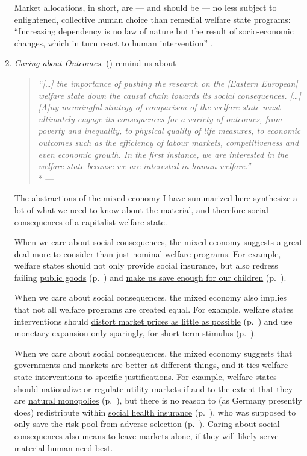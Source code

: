 \begin{enumerate}
	Market allocations, in short, are --- and should be --- no less subject to enlightened, collective human choice than remedial welfare state programs:
	``Increasing dependency is no law of nature but the result of socio-economic changes, which in turn react to human intervention'' \citep[x]{Esping-Andersen2002}.

	\item \emph{Caring about Outcomes.}
	\citeauthor{Haggard2009} (\citeyear[236]{Haggard2009}) remind us about

	\begin{quote}
		\emph{``[\ldots]
		the importance of pushing the research on the [Eastern European] welfare state down the causal chain towards its social consequences.
		[\ldots]
		[A]ny meaningful strategy of comparison of the welfare state must ultimately engage its consequences for a variety of outcomes, from poverty and inequality, to physical quality of life measures, to economic outcomes such as the efficiency of labour markets, competitiveness and even economic growth.
		In the first instance, we are interested in the welfare state because we are interested in human welfare.''}
		\\*
		--- \citet*[236]{Haggard2009}
	\end{quote}

	The abstractions of the mixed economy I have summarized here synthesize a lot of what we need to know about the material, and therefore social consequences of a capitalist welfare state.

	When we care about social consequences, the mixed economy suggests a great deal more to consider than just nominal welfare programs.
	For example, welfare states should not only provide social insurance, but also redress failing \hyperref[sec:public-good]{public goods} (p.~\pageref{sec:public-good}) and \hyperref[sec:long-term-inconsistency]{make us save enough for our children} (p.~\pageref{sec:long-term-inconsistency}).

	When we care about social consequences, the mixed economy also implies that not all welfare programs are created equal.
	For example, welfare states interventions should \hyperref[sec:minimal-DWL]{distort market prices as little as possible} (p.~\pageref{sec:minimal-DWL}) and use \hyperref[sec:price-stability]{monetary expansion only sparingly, for short-term stimulus} (p.~\pageref{sec:price-stability}).

	When we care about social consequences, the mixed economy suggests that  governments and markets are better at different things, and it ties welfare state interventions to specific justifications.
	For example, welfare states should nationalize or regulate utility markets if and to the extent that they are \hyperref[sec:natural-monopoly]{natural monopolies} (p.~\pageref{sec:natural-monopoly}), but there is no reason to (as Germany presently does) redistribute within \hyperref[sec:state-insurance]{social health insurance} (p.~\pageref{sec:state-insurance}), who was supposed to only save the risk pool from \hyperref[sec:adverse-selection]{adverse selection} (p.~\pageref{sec:adverse-selection}).
	Caring about social consequences also means to leave markets alone, if they will likely serve material human need best.


\end{enumerate}
